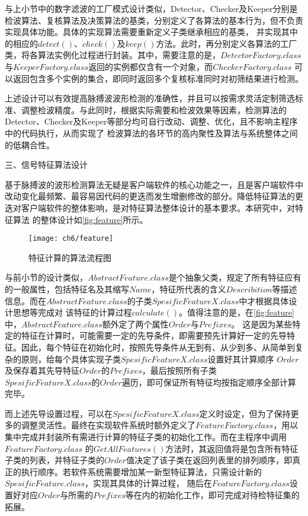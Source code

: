 与上小节中的数字滤波的工厂模式设计类似，Detector、Checker及Keeper分别是检波算法、复核算法及决策算法的基类，分别定义了各算法的基本行为，但不负责实现具体功能。具体的实现算法需要重新定义子类继承相应的基类，
并实现其中的相应的$detect()$、$check()$及$keep()$方法。此时，再分别定义各算法的工厂类，将各算法实例化过程进行封装。其中，需要注意的是，$DetectorFactory.class$与$KeeperFactory.class$返回的实例都仅含有一个对象，而$CheckerFactory.class$
可以返回包含多个实例的集合，即同时返回多个复核标准同时对初筛结果进行检测。

上述设计可以有效提高脉搏波波形检测的准确性，并且可以按需求灵活定制筛选标准、调整检波精度。与此同时，根据实际需要和检波效果等因素，检测算法的Detector、Checker及Keeper等部分均可自行改动、调整、优化，且不影响主程序中的代码执行，从而实现了
检波算法的各环节的高内聚性及算法与系统整体之间的低耦合性。

三、信号特征算法设计

基于脉搏波的波形检测算法无疑是客户端软件的核心功能之一，且是客户端软件中改动变化最频繁、最容易因代码的更迭而发生增删修改的部分。降低特征算法的更迭对客户端软件的整体影响，是对特征算法整体设计的基本要求。本研究中，对特征算法
的整体设计如\autoref{fig:feature}所示。
\begin{figure}[htbp]
    \centering
    \texttt{[image: ch6/feature]}
    \caption{\label{fig:feature}特征计算的算法流程图}
\end{figure}

与前小节的设计类似，$AbstractFeature.class$是个抽象父类，规定了所有特征应有的一般属性，包括特征名及其缩写$Name$，特征所代表的含义$Describition$等描述信息。而在$AbstractFeature.class$的子类$SpesificFeatureX.class$中才根据具体设计思想等完成对
该特征的计算过程$calculate()$。值得注意的是，在\autoref{fig:feature}中，$AbstractFeature.class$额外定了两个属性$Order$与$Prefixes$。
这是因为某些特定的特征在计算时，可能需要一定的先导条件，即需要预先计算好一定的先导特征。因此，每个特征在初始化时，按照先导条件从无到有、从少到多、从简单到复杂的原则，给每个具体实现子类$SpesificFeatureX.class$设置好其计算顺序
$Order$及保存着其先导特征$Order$的$Prefixes$，最后按照所有子类$SpesificFeatureX.class$的$Order$遍历，即可保证所有特征均按指定顺序全部计算完毕。

而上述先导设置过程，可以在$SpesificFeatureX.class$定义时设定，但为了保持更多的调整灵活性。最终在实现软件系统时额外定义了$FeatureFactory.class$，用以集中完成并封装所有需进行计算的特征子类的初始化工作。而在主程序中调用$FeatureFactory.class$
的$GetAllFeatures()$方法时，其返回值将是包含所有特征子类的列表，并特征子类的$Order$值决定了该子类在返回列表里的排列顺序，即真正的执行顺序。若软件系统需要增加某一新型特征算法，只需设计新的$SpesificFeature.class$，实现其具体的计算过程，
随后在$FeatureFactory.class$设置好对应$Order$与所需的$Prefixes$等在内的初始化工作，即可完成对待检特征集的拓展。

